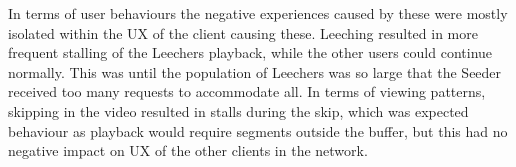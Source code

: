 In terms of user behaviours the negative experiences caused by these were mostly isolated within the \ac{UX} of the client causing these. Leeching resulted in more frequent stalling of the Leechers playback, while the other users could continue normally. This was until the population of Leechers was so large that the Seeder received too many requests to accommodate all. In terms of viewing patterns, skipping in the video resulted in stalls during the skip, which was expected behaviour as playback would require segments outside the buffer, but this had no negative impact on \ac{UX} of the other clients in the network.


